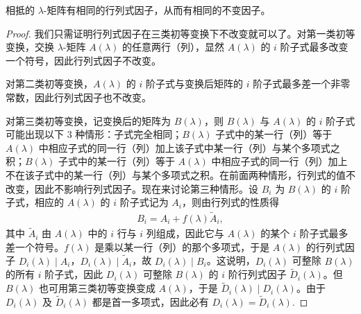 \documentclass[../../main.tex]{subfiles}
\begin{document}
\begin{theorem}\label{theorem:相抵的lamda矩阵有相同的行列式因子和不变因子}
相抵的 $\lambda$-矩阵有相同的行列式因子，从而有相同的不变因子。
\end{theorem}
\begin{proof}
我们只需证明行列式因子在三类初等变换下不改变就可以了。对第一类初等变换，交换 $\lambda$-矩阵 $A(\lambda)$ 的任意两行（列），显然 $A(\lambda)$ 的 $i$ 阶子式最多改变一个符号，因此行列式因子不改变。

对第二类初等变换，$A(\lambda)$ 的 $i$ 阶子式与变换后矩阵的 $i$ 阶子式最多差一个非零常数，因此行列式因子也不改变。

对第三类初等变换，记变换后的矩阵为 $B(\lambda)$，则 $B(\lambda)$ 与 $A(\lambda)$ 的 $i$ 阶子式可能出现以下 3 种情形：子式完全相同；$B(\lambda)$ 子式中的某一行（列）等于 $A(\lambda)$ 中相应子式的同一行（列）加上该子式中某一行（列）与某个多项式之积；$B(\lambda)$ 子式中的某一行（列）等于 $A(\lambda)$ 中相应子式的同一行（列）加上不在该子式中的某一行（列）与某个多项式之积。在前面两种情形，行列式的值不改变，因此不影响行列式因子。现在来讨论第三种情形。设 $B_i$ 为 $B(\lambda)$ 的 $i$ 阶子式，相应的 $A(\lambda)$ 的 $i$ 阶子式记为 $A_i$，则由行列式的性质得
\begin{align*}
B_i = A_i + f(\lambda)\widetilde{A}_i,
\end{align*}
其中 $\widetilde{A}_i$ 由 $A(\lambda)$ 中的 $i$ 行与 $i$ 列组成，因此它与 $A(\lambda)$ 的某个 $i$ 阶子式最多差一个符号。$f(\lambda)$ 是乘以某一行（列）的那个多项式，于是 $A(\lambda)$ 的行列式因子 $D_i(\lambda)\mid A_i$，$D_i(\lambda)\mid\widetilde{A}_i$，故 $D_i(\lambda)\mid B_i$。这说明，$D_i(\lambda)$ 可整除 $B(\lambda)$ 的所有 $i$ 阶子式，因此 $D_i(\lambda)$ 可整除 $B(\lambda)$ 的 $i$ 阶行列式因子 $\widetilde{D}_i(\lambda)$。但 $B(\lambda)$ 也可用第三类初等变换变成 $A(\lambda)$，于是 $\widetilde{D}_i(\lambda)\mid D_i(\lambda)$。由于 $D_i(\lambda)$ 及 $\widetilde{D}_i(\lambda)$ 都是首一多项式，因此必有 $D_i(\lambda)=\widetilde{D}_i(\lambda)$.
\end{proof}
\end{document}
